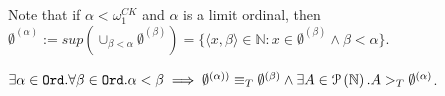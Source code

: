 Note that if $\alpha < \omega_1^{CK}$ and $\alpha$ is a limit ordinal, then $\emptyset^{(\alpha)}:=sup(\cup_{\beta < \alpha} \emptyset^{(\beta)})=\{\langle x, \beta \rangle \in \mathbb{N} : x \in \emptyset^{(\beta)} \land \beta < \alpha\}$.

\begin{proposition}
$\exists \alpha \in \mathtt{Ord}. \forall \beta \in \mathtt{Ord}. \alpha < \beta \implies \emptyset^{(\alpha))} \equiv_T \emptyset^{(\beta)} \land \exists A \in \mathcal{P} \left({ \mathbb{N} }\right). A >_T \emptyset^{(\alpha)}$.
\end{proposition}